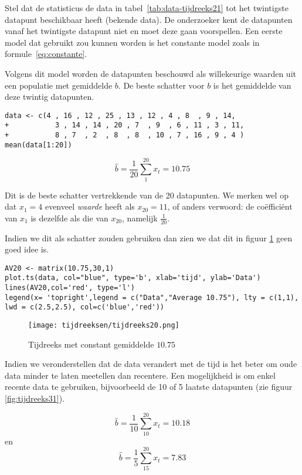 Stel dat de statisticus de data in tabel~\ref{tab:data-tijdreeks21} tot het twintigste datapunt beschikbaar heeft (bekende data). De onderzoeker kent de datapunten vanaf het twintigste datapunt niet en moet deze gaan voorspellen. Een eerste model dat gebruikt zou kunnen worden is het constante model zoals in formule~\ref{eq:constante}. 

Volgens dit model worden de datapunten beschouwd als willekeurige waarden uit een populatie met gemiddelde $b$. De beste schatter voor $b$ is het gemiddelde van deze twintig datapunten. 

\begin{lstlisting}
data <- c(4 , 16 , 12 , 25 , 13 , 12 , 4 , 8  , 9 , 14, 
+           3 , 14 , 14 , 20 , 7  , 9  , 6 , 11 , 3 , 11, 
+           8 , 7  , 2  , 8  , 8  , 10 , 7 , 16 , 9 , 4 )
mean(data[1:20])
\end{lstlisting}

\[ \widehat{b} = \frac{1}{20} \sum_{1}^{20} x_{t}= 10.75 \] 

Dit is de beste schatter vertrekkende van de 20 datapunten. We merken wel op dat $x_{1} =  4$ evenveel \textit{waarde} heeft als $x_{20} = 11$, of anders verwoord: de coëfficiënt van $x_{1}$ is dezelfde als die van $x_{20}$, namelijk $\frac{1}{20}$.

Indien we dit als schatter zouden gebruiken dan zien we dat dit in figuur \ref{fig:tijdreeks21} geen goed idee is.

\begin{lstlisting}
AV20 <- matrix(10.75,30,1)
plot.ts(data, col="blue", type='b', xlab='tijd', ylab='Data')
lines(AV20,col='red', type='l')
legend(x= 'topright',legend = c("Data","Average 10.75"), lty = c(1,1), lwd = c(2.5,2.5), col=c('blue','red'))
\end{lstlisting}

\begin{figure}
	\centering
		\texttt{[image: tijdreeksen/tijdreeks20.png]}
	\caption{Tijdreeks met constant gemiddelde $10.75$}
	\label{fig:tijdreeks21}
\end{figure}

Indien we veronderstellen dat de data verandert met de tijd is het beter om oude data minder te laten meetellen dan recentere. Een mogelijkheid is om enkel recente data te gebruiken, bijvoorbeeld de 10 of 5 laatste datapunten (zie figuur \ref{fig:tijdreeks31}).

\[ \widehat{b} = \frac{1}{10} \sum_{10}^{20} x_{t} = 10.18 \] en
\[ \widehat{b} = \frac{1}{5} \sum_{15}^{20} x_{t} = 7.83 \]

